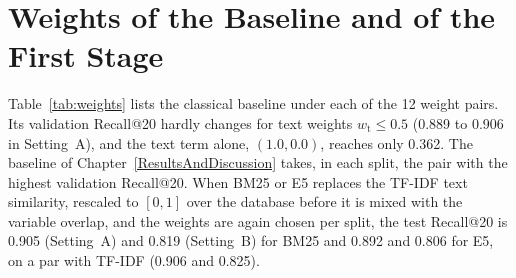 \section{Weights of the Baseline and of the First Stage}
\label{app:weights}
Table~\ref{tab:weights} lists the classical baseline under each of the 12 weight pairs. Its
validation Recall@20 hardly changes for text weights $w_{\mathrm{t}} \le 0.5$ (0.889 to 0.906 in
Setting~A), and the text term alone, $(1.0, 0.0)$, reaches only 0.362. The baseline of
Chapter~\ref{ResultsAndDiscussion} takes, in each split, the pair with the highest validation
Recall@20. When BM25 or E5 replaces the TF-IDF text similarity, rescaled to $[0, 1]$ over the
database before it is mixed with the variable overlap, and the weights are again chosen per split,
the test Recall@20 is 0.905 (Setting~A) and 0.819 (Setting~B) for BM25 and 0.892 and 0.806 for E5,
on a par with TF-IDF (0.906 and 0.825).

